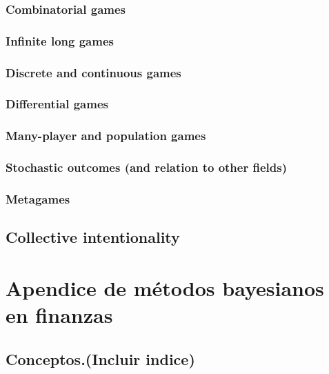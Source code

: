        \subsection{Combinatorial games}
        \subsection{Infinite long games}
        \subsection{Discrete and continuous games}
        \subsection{Differential games}
        \subsection{Many-player and population games}
        \subsection{Stochastic outcomes (and relation to other fields)}
        \subsection{Metagames}
    \section{Collective intentionality}
        
\chapter{Apendice de métodos bayesianos en finanzas}
    \section{Conceptos.(Incluir indice)}